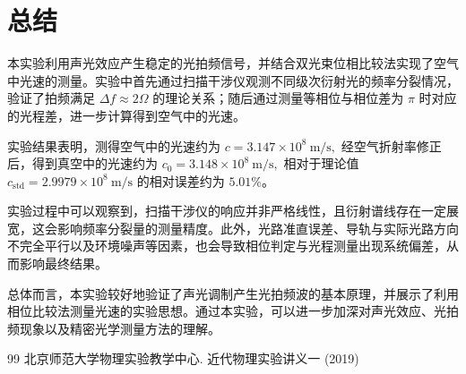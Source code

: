 \documentclass[a4paper]{ctexart}
\begin{document}
    \section{总结}

本实验利用声光效应产生稳定的光拍频信号，并结合双光束位相比较法实现了空气中光速的测量。实验中首先通过扫描干涉仪观测不同级次衍射光的频率分裂情况，验证了拍频满足
$
\Delta f \approx 2\Omega
$
的理论关系；随后通过测量等相位与相位差为 $\pi$ 时对应的光程差，进一步计算得到空气中的光速。

实验结果表明，测得空气中的光速约为
$
c = 3.147\times10^8\ \mathrm{m/s},
$
经空气折射率修正后，得到真空中的光速约为
$
c_0 = 3.148\times10^8\ \mathrm{m/s},
$
相对于理论值
$
c_{\mathrm{std}} = 2.9979\times10^8\ \mathrm{m/s}
$
的相对误差约为 $5.01\%$。

实验过程中可以观察到，扫描干涉仪的响应并非严格线性，且衍射谱线存在一定展宽，这会影响频率分裂量的测量精度。此外，光路准直误差、导轨与实际光路方向不完全平行以及环境噪声等因素，也会导致相位判定与光程测量出现系统偏差，从而影响最终结果。

总体而言，本实验较好地验证了声光调制产生光拍频波的基本原理，并展示了利用相位比较法测量光速的实验思想。通过本实验，可以进一步加深对声光效应、光拍频现象以及精密光学测量方法的理解。

   
    \begin{thebibliography}{99}
        北京师范大学物理实验教学中心. 近代物理实验讲义一 (2019)
    \end{thebibliography}
\end{document}
